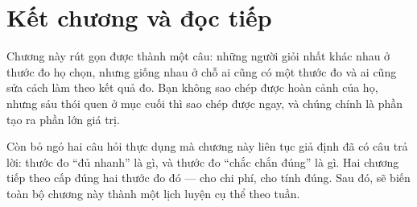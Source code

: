 \documentclass[../../algorithm.tex]{subfiles}
\begin{document}
\section*{Kết chương và đọc tiếp}

Chương này rút gọn được thành một câu: những người giỏi nhất khác nhau ở thước đo họ chọn, nhưng giống nhau ở chỗ ai cũng có một thước đo và ai cũng sửa cách làm theo kết quả đo. Bạn không sao chép được hoàn cảnh của họ, nhưng sáu thói quen ở mục cuối thì sao chép được ngay, và chúng chính là phần tạo ra phần lớn giá trị.

Còn bỏ ngỏ hai câu hỏi thực dụng mà chương này liên tục giả định đã có câu trả lời: thước đo ``đủ nhanh'' là gì, và thước đo ``chắc chắn đúng'' là gì. Hai chương tiếp theo cấp đúng hai thước đo đó ---  cho chi phí,  cho tính đúng. Sau đó,  sẽ biến toàn bộ chương này thành một lịch luyện cụ thể theo tuần.
\ifSubfilesClassLoaded{\printbibliography[title={Nguồn}]}{}
\end{document}
